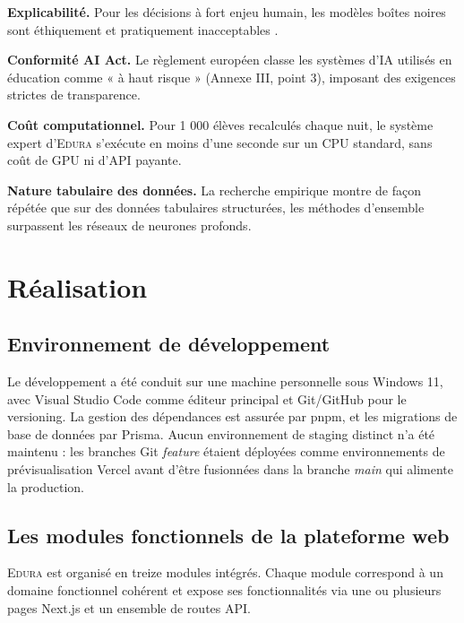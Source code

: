 \documentclass[12pt,a4paper,oneside]{report}
\newcommand{\edura}{\textsc{Edura}}
\begin{document}
\textbf{Explicabilité.} Pour les décisions à fort enjeu humain, les modèles boîtes noires sont éthiquement et pratiquement inacceptables \autocite{rudin2019stop}.

\textbf{Conformité AI Act.} Le règlement européen \autocite{euaiact2024} classe les systèmes d'IA utilisés en éducation comme « à haut risque » (Annexe III, point 3), imposant des exigences strictes de transparence.

\textbf{Coût computationnel.} Pour 1 000 élèves recalculés chaque nuit, le système expert d'\edura{} s'exécute en moins d'une seconde sur un CPU standard, sans coût de GPU ni d'API payante.

\textbf{Nature tabulaire des données.} La recherche empirique \autocite{mardolkar2021forecasting, chen2016xgboost} montre de façon répétée que sur des données tabulaires structurées, les méthodes d'ensemble surpassent les réseaux de neurones profonds.

\chapter{Réalisation}

\section{Environnement de développement}

Le développement a été conduit sur une machine personnelle sous Windows 11, avec Visual Studio Code comme éditeur principal et Git/GitHub pour le versioning. La gestion des dépendances est assurée par pnpm, et les migrations de base de données par Prisma. Aucun environnement de staging distinct n'a été maintenu : les branches Git \textit{feature} étaient déployées comme environnements de prévisualisation Vercel avant d'être fusionnées dans la branche \textit{main} qui alimente la production.

\section{Les modules fonctionnels de la plateforme web}

\edura{} est organisé en treize modules intégrés. Chaque module correspond à un domaine fonctionnel cohérent et expose ses fonctionnalités via une ou plusieurs pages Next.js et un ensemble de routes API.
\end{document}

